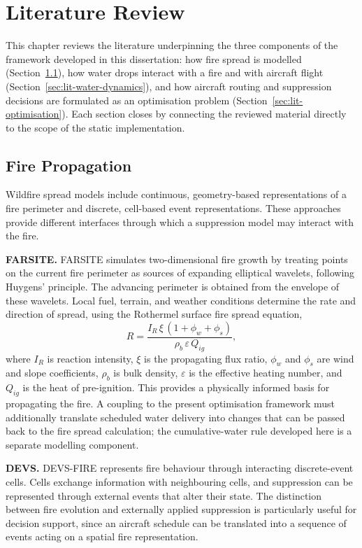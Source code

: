 \chapter{Literature Review}
\label{ch:literature}

This chapter reviews the literature underpinning the three components of the framework developed in this dissertation: how fire spread is modelled (Section~\ref{sec:lit-fire-propagation}), how water drops interact with a fire and with aircraft flight (Section~\ref{sec:lit-water-dynamics}), and how aircraft routing and suppression decisions are formulated as an optimisation problem (Section~\ref{sec:lit-optimisation}). Each section closes by connecting the reviewed material directly to the scope of the static implementation.

\section{Fire Propagation}
\label{sec:lit-fire-propagation}

Wildfire spread models include continuous, geometry-based representations of a fire perimeter and discrete, cell-based event representations. These approaches provide different interfaces through which a suppression model may interact with the fire.

\textbf{FARSITE.} FARSITE \cite{finney1998farsite} simulates two-dimensional fire growth by treating points on the current fire perimeter as sources of expanding elliptical wavelets, following Huygens' principle. The advancing perimeter is obtained from the envelope of these wavelets. Local fuel, terrain, and weather conditions determine the rate and direction of spread, using the Rothermel surface fire spread equation,
\begin{equation}
    R = \frac{I_R\,\xi\,(1+\phi_w+\phi_s)}{\rho_b\,\varepsilon\,Q_{ig}},
\end{equation}
where $I_R$ is reaction intensity, $\xi$ is the propagating flux ratio, $\phi_w$ and $\phi_s$ are wind and slope coefficients, $\rho_b$ is bulk density, $\varepsilon$ is the effective heating number, and $Q_{ig}$ is the heat of pre-ignition. This provides a physically informed basis for propagating the fire. A coupling to the present optimisation framework must additionally translate scheduled water delivery into changes that can be passed back to the fire spread calculation; the cumulative-water rule developed here is a separate modelling component.

\textbf{DEVS.} DEVS-FIRE \cite{hu2012devsfire} represents fire behaviour through interacting discrete-event cells. Cells exchange information with neighbouring cells, and suppression can be represented through external events that alter their state. The distinction between fire evolution and externally applied suppression is particularly useful for decision support, since an aircraft schedule can be translated into a sequence of events acting on a spatial fire representation.

